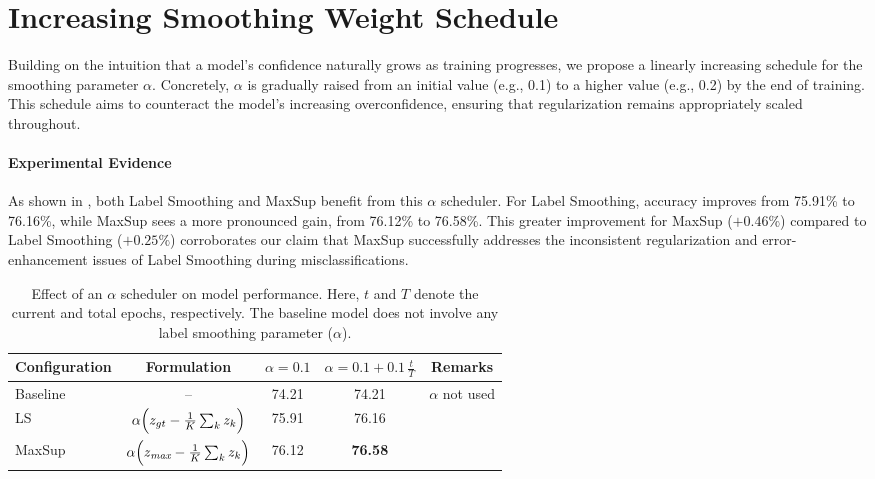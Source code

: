\section{Increasing Smoothing Weight Schedule}
\label{app:alpha}
Building on the intuition that a model’s confidence naturally grows as training progresses, we propose a linearly increasing schedule for the smoothing parameter \(\alpha\). Concretely, \(\alpha\) is gradually raised from an initial value (e.g., 0.1) to a higher value (e.g., 0.2) by the end of training. This schedule aims to counteract the model’s increasing overconfidence, ensuring that regularization remains appropriately scaled throughout.

\paragraph{Experimental Evidence}
As shown in , both Label Smoothing and MaxSup benefit from this \(\alpha\) scheduler. For Label Smoothing, accuracy improves from 75.91\% to 76.16\%, while MaxSup sees a more pronounced gain, from 76.12\% to 76.58\%. This greater improvement for MaxSup (\(+0.46\%\)) compared to Label Smoothing (\(+0.25\%\)) corroborates our claim that MaxSup successfully addresses the inconsistent regularization and error-enhancement issues of Label Smoothing during misclassifications.



\begin{table*}[ht]
\centering
\footnotesize
\caption{Effect of an $\alpha$ scheduler on model performance. 
Here, $t$ and $T$ denote the current and total epochs, respectively. 
The baseline model does not involve any label smoothing parameter (\(\alpha\)).}
\label{tab:alpha}
\begin{tabular}{@{}lcccc@{}}
\toprule
\textbf{Configuration} 
& \textbf{Formulation} 
& \multicolumn{1}{c}{\(\alpha=0.1\)} 
& \multicolumn{1}{c}{\(\alpha = 0.1 + 0.1\, \tfrac{t}{T}\)} 
& \textbf{Remarks}\\
\midrule
Baseline 
& -- 
& \multicolumn{1}{c}{74.21} 
& \multicolumn{1}{c}{74.21} 
& \(\alpha\) not used \\

LS 
& \(\alpha\Bigl(z_{gt} - \tfrac{1}{K}\sum_{k} z_k\Bigr)\)
& 75.91 
& 76.16 
&  \\
MaxSup 
& \(\alpha\Bigl(z_{\textit{max}} - \tfrac{1}{K}\sum_{k} z_k\Bigr)\)
& 76.12 
& \textbf{76.58} 
&  \\
\bottomrule
\end{tabular}
\end{table*}




